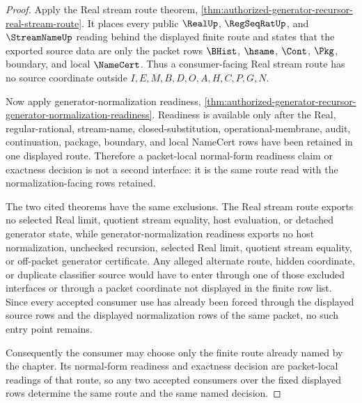 \begin{proof}
Apply the Real stream route theorem, \autoref{thm:authorized-generator-recursor-real-stream-route}. It places every public $\RealUp$, $\RegSeqRatUp$, and $\StreamNameUp$ reading behind the displayed finite route and states that the exported source data are only the packet rows $\BHist$, $\hsame$, $\Cont$, $\Pkg$, boundary, and local $\NameCert$. Thus a consumer-facing Real stream route has no source coordinate outside $I,E,M,B,D,O,A,H,C,P,G,N$.

Now apply generator-normalization readiness, \autoref{thm:authorized-generator-recursor-generator-normalization-readiness}. Readiness is available only after the Real, regular-rational, stream-name, closed-substitution, operational-membrane, audit, continuation, package, boundary, and local NameCert rows have been retained in one displayed route. Therefore a packet-local normal-form readiness claim or exactness decision is not a second interface: it is the same route read with the normalization-facing rows retained.

The two cited theorems have the same exclusions. The Real stream route exports no selected Real limit, quotient stream equality, host evaluation, or detached generator state, while generator-normalization readiness exports no host normalization, unchecked recursion, selected Real limit, quotient stream equality, or off-packet generator certificate. Any alleged alternate route, hidden coordinate, or duplicate classifier source would have to enter through one of those excluded interfaces or through a packet coordinate not displayed in the finite row list. Since every accepted consumer use has already been forced through the displayed source rows and the displayed normalization rows of the same packet, no such entry point remains.

Consequently the consumer may choose only the finite route already named by the chapter. Its normal-form readiness and exactness decision are packet-local readings of that route, so any two accepted consumers over the fixed displayed rows determine the same route and the same named decision.
\end{proof}
